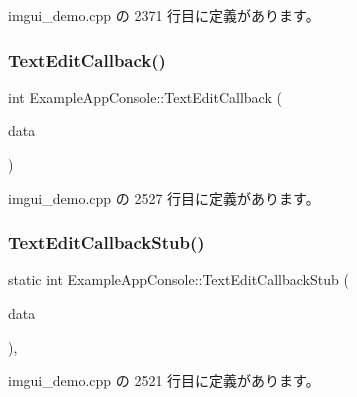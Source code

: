  imgui\+\_\+demo.\+cpp の 2371 行目に定義があります。

\mbox{\label{struct_example_app_console_aae97c81ddab660e6e0296c21844c4a7b}} 
\subsubsection{\texorpdfstring{Text\+Edit\+Callback()}{TextEditCallback()}}
{\footnotesize\ttfamily int Example\+App\+Console\+::\+Text\+Edit\+Callback (\begin{DoxyParamCaption}\item[{\mbox{\hyperlink{struct_im_gui_text_edit_callback_data}{Im\+Gui\+Text\+Edit\+Callback\+Data}} $\ast$}]{data }\end{DoxyParamCaption})\hspace{0.3cm}{\ttfamily [inline]}}



 imgui\+\_\+demo.\+cpp の 2527 行目に定義があります。

\mbox{\label{struct_example_app_console_a722d9b5dc6df127f27c83afeee29bfd3}} 
\subsubsection{\texorpdfstring{Text\+Edit\+Callback\+Stub()}{TextEditCallbackStub()}}
{\footnotesize\ttfamily static int Example\+App\+Console\+::\+Text\+Edit\+Callback\+Stub (\begin{DoxyParamCaption}\item[{\mbox{\hyperlink{struct_im_gui_text_edit_callback_data}{Im\+Gui\+Text\+Edit\+Callback\+Data}} $\ast$}]{data }\end{DoxyParamCaption})\hspace{0.3cm}{\ttfamily [inline]}, {\ttfamily [static]}}



 imgui\+\_\+demo.\+cpp の 2521 行目に定義があります。



